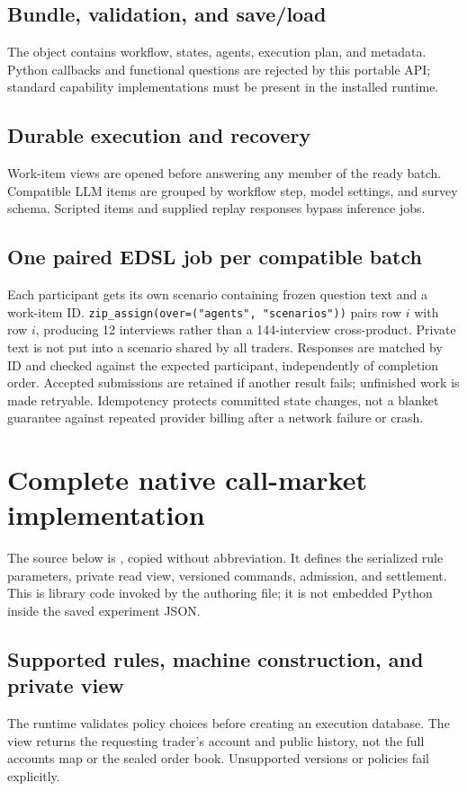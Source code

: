 \documentclass[11pt,letterpaper]{article}
\newcommand{\code}[1]{\texttt{\small #1}}
\begin{document}
\subsection{Bundle, validation, and save/load}
The object contains workflow, states, agents, execution plan, and metadata.
Python callbacks and functional questions are rejected by this portable API;
standard capability implementations must be present in the installed runtime.
\RuntimeBundle

\subsection{Durable execution and recovery}
Work-item views are opened before answering any member of the ready batch.
Compatible LLM items are grouped by workflow step, model settings, and survey
schema. Scripted items and supplied replay responses bypass inference jobs.
\RuntimeRun

\subsection{One paired EDSL job per compatible batch}
Each participant gets its own scenario containing frozen question text and a
work-item ID. \code{zip\_assign(over=("agents", "scenarios"))} pairs row $i$
with row $i$, producing 12 interviews rather than a 144-interview cross-product.
Private text is not put into a scenario shared by all traders. Responses are
matched by ID and checked against the expected participant, independently of
completion order. Accepted submissions are retained if another result fails;
unfinished work is made retryable. Idempotency protects committed state
changes, not a blanket guarantee against repeated provider billing after a
network failure or crash.
\RuntimeBatch

\Needspace{0.24\textheight}
\section{Complete native call-market implementation}\label{app:market}
The source below is , copied without
abbreviation. It defines the serialized rule parameters, private read view,
versioned commands, admission, and settlement. This is library code invoked by
the authoring file; it is not embedded Python inside the saved experiment JSON.

\subsection{Supported rules, machine construction, and private view}
The runtime validates policy choices before creating an execution database.
The view returns the requesting trader's account and public history, not the
full accounts map or the sealed order book. Unsupported versions or policies
fail explicitly.
\MarketDefinition
\end{document}
